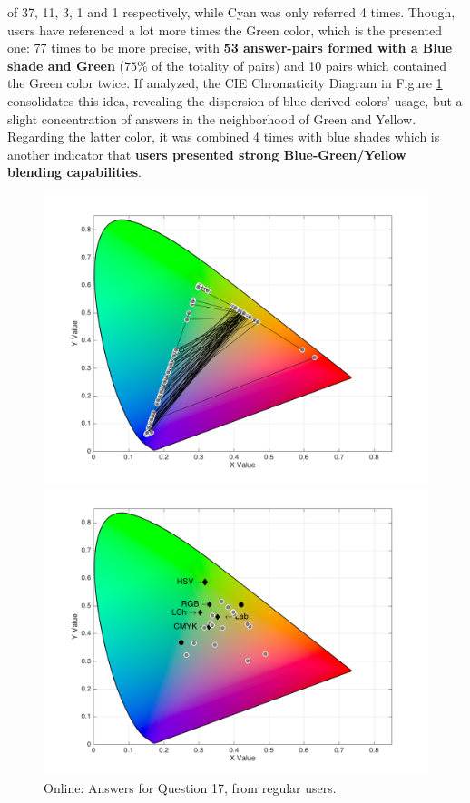 of 37, 11, 3, 1 and 1 respectively, while Cyan was only referred 4 times. Though, users have referenced a lot more times the
Green color, which is the presented one: 77 times to be more precise, with \textbf{53 answer-pairs formed with a Blue shade and Green} ($75\%$ of the
totality of pairs) and 10 pairs which contained the Green color twice. If analyzed, the CIE Chromaticity Diagram in Figure \ref{fig:greenblend_1} consolidates
this idea, revealing the dispersion of blue derived colors' usage, but a slight concentration of answers in the neighborhood of Green and Yellow.
Regarding the latter color, it was combined 4 times with blue shades which is another indicator that \textbf{users presented strong Blue-Green/Yellow blending
capabilities}.
%
\begin{figure}[!htbp]
  \centering
  \begin{minipage}{0.48\textwidth}
    \centering
    \includegraphics[width=\textwidth]{images/results/17_online_regularUsers.png}
    \caption[Online: Answers for Question 17, from regular users.]{Online: Answers for Question 17, from regular users.}
    \label{fig:greenblend_1}
  \end{minipage}\hfill
  \begin{minipage}{0.48\textwidth}
    \centering
    \includegraphics[width=\textwidth]{images/results/32_online_regularUsers.png}

\end{minipage}
\end{figure}
